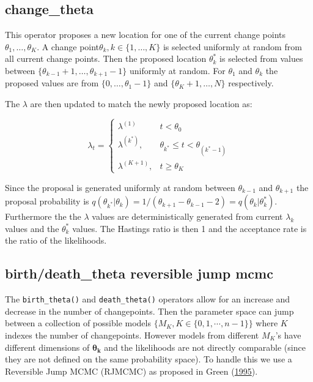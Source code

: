 \documentclass[11pt,a4paper]{article}
\numberwithin{equation}{section}
\begin{document}
\hypertarget{change_theta}{%
\subsection{change\_theta}\label{change_theta}}

This operator proposes a new location for one of the current change
points \(\theta_1,\dots, \theta_K\). A change
point\(\theta_k, k \in \{1, \dots, K\}\) is selected uniformly at random
from all current change points. Then the proposed location
\(\theta_k^*\) is selected from values between
\(\{\theta_{k-1}+1,\dots, \theta_{k+1}-1\}\) uniformly at random. For
\(\theta_1\) and \(\theta_k\) the proposed values are from
\(\{0,\dots, \theta_1-1\}\) and \(\{\theta_K+1,\dots, N\}\)
respectively.

The \(\lambda\) are then updated to match the newly proposed location
as:

\[ \lambda_t =  \begin{cases} \lambda^{(1)} & t < \theta_0 \\
\lambda^{(k^*)}, & \theta_{k^*} \leq t < \theta_{(k^*-1)} \\
\lambda^{(K+1)}, & t \geq \theta_K \end{cases}\]

Since the proposal is generated uniformly at random between
\(\theta_{k-1}\) and \(\theta_{k+1}\) the proposal probability is
\(q(\theta_{k^*}|\theta_k) = 1/(\theta_{k+1}-\theta_{k-1}-2) = q(\theta_k|\theta_k^*)\).
Furthermore the the \(\lambda\) values are deterministically generated
from current \(\lambda_k\) values and the \(\theta_k^*\) values. The
Hastings ratio is then 1 and the acceptance rate is the ratio of the
likelihoods.

\hypertarget{birthdeath_theta-reversible-jump-mcmc}{%
\subsection{birth/death\_theta reversible jump
mcmc}\label{birthdeath_theta-reversible-jump-mcmc}}

The \texttt{birth\_theta()} and \texttt{death\_theta()} operators allow
for an increase and decrease in the number of changepoints. Then the
parameter space can jump between a collection of possible models
\(\{M_K, K \in \{0,1,\cdots,n-1\}\}\) where \(K\) indexes the number of
changepoints. However models from different \(M_K\)'s have different
dimensions of \(\boldsymbol{\theta_k}\) and the likelihoods are not
directly comparable (since they are not defined on the same probability
space). To handle this we use a Reversible Jump MCMC (RJMCMC) as
proposed in Green (\protect\hyperlink{ref-green_reversible_1995}{1995}).
\end{document}
